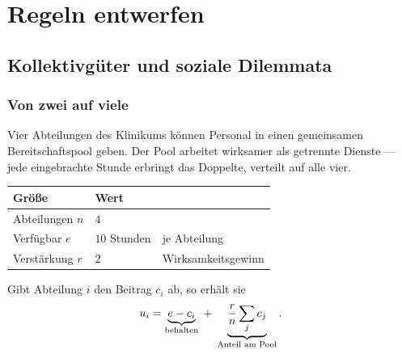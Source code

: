 \part{Regeln entwerfen}

\chapter{Kollektivgüter und soziale Dilemmata}

\section{Von zwei auf viele}

\begin{merksatz}
Vier Abteilungen des Klinikums können Personal in einen gemeinsamen Bereitschaftspool geben. Der Pool arbeitet wirksamer als getrennte Dienste --- jede eingebrachte Stunde erbringt das Doppelte, verteilt auf alle vier.

\begin{center}
{\small
\renewcommand{\arraystretch}{1.5}
\begin{tabular}{@{}P{2.6cm}P{2.0cm}P{2.8cm}@{}}
\toprule
\textbf{Größe} & \textbf{Wert} & \\
\midrule
Abteilungen $n$ & $4$ & \\
Verfügbar $e$ & $10$ Stunden & je Abteilung\\
Verstärkung $r$ & $2$ & Wirksamkeits\-gewinn\\
\bottomrule
\end{tabular}}
\end{center}

Gibt Abteilung $i$ den Beitrag $c_i$ ab, so erhält sie
\[ u_i = \underbrace{e-c_i}_{\text{behalten}} \;+\; \underbrace{\frac{r}{n}\sum_j c_j}_{\text{Anteil am Pool}} . \]
\end{merksatz}

